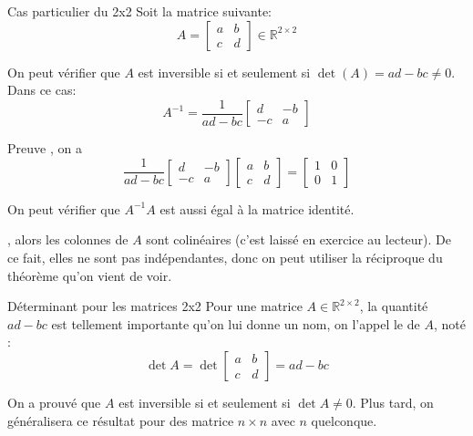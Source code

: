\documentclass[a4paper]{article}
\begin{document}
\begin{parag}{Cas particulier du 2x2}
    Soit la matrice suivante:
    \[A = \begin{bmatrix} a & b \\ c & d \end{bmatrix} \in \mathbb{R}^{2\times2}\]

    On peut vérifier que $A$ est inversible si et seulement si $\det\left(A\right) = ad - bc \neq 0$. Dans ce cas:
    \[A^{-1} = \frac{1}{ad - bc} \begin{bmatrix} d & -b \\ -c & a \end{bmatrix} \]

    \begin{subparag}{Preuve}
        , on a
        \[\frac{1}{ad - bc} \begin{bmatrix} d & -b \\ -c & a \end{bmatrix} \begin{bmatrix} a & b \\ c & d \end{bmatrix} = \begin{bmatrix} 1 & 0 \\ 0 & 1 \end{bmatrix} \]

        On peut vérifier que $A^{-1} A$ est aussi égal à la matrice identité.

        \vspace{1em}
        , alors les colonnes de $A$ sont colinéaires (c'est laissé en exercice au lecteur). De ce fait, elles ne sont pas indépendantes, donc  on peut utiliser la réciproque du théorème qu'on vient de voir.
    \end{subparag}

\end{parag}

\begin{parag}{Déterminant pour les matrices 2x2}
    Pour une matrice $A \in \mathbb{R}^{2\times2}$, la quantité $ad - bc$ est tellement importante qu'on lui donne un nom, on l'appel le  de $A$, noté :
    \[\det A = \det\begin{bmatrix} a & b \\ c & d \end{bmatrix} = ad - bc\]

    On a prouvé que $A$ est inversible si et seulement si $\det A \neq 0$. Plus tard, on généralisera ce résultat pour des matrice $n \times n$ avec $n$ quelconque.
\end{parag}
\end{document}
